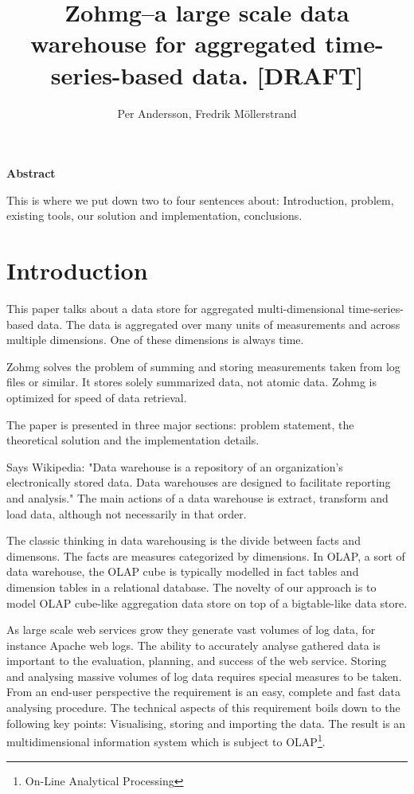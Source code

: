 \documentclass[a4paper,10pt]{book}
\author{Per Andersson, Fredrik M{\"o}llerstrand}
\title{Zohmg--a large scale data warehouse for aggregated time-series-based
data. [DRAFT]}
\begin{document}
\maketitle



\noindent \Large{\textbf{Abstract}}

\vspace{12pt}

\noindent This is where we put down two to four sentences about:
Introduction, problem, existing tools, our solution and implementation,
conclusions.


\tableofcontents

\vfill

\pagebreak



\chapter{Introduction}

This paper talks about a data store for aggregated multi-dimensional time-series-based data. The data is aggregated over many units of measurements and across multiple dimensions. One of these dimensions is always time.

Zohmg solves the problem of summing and storing measurements taken from log files or similar. It stores solely summarized data, not atomic data. Zohmg is optimized for speed of data retrieval.

The paper is presented in three major sections: problem statement, the theoretical solution and the implementation details.

Says Wikipedia: "Data warehouse is a repository of an organization's electronically stored data. Data warehouses are designed to facilitate reporting and analysis." The main actions of a data warehouse is extract, transform and load data, although not necessarily in that order.

The classic thinking in data warehousing is the divide between facts and dimensons. The facts are measures categorized by dimensions. In OLAP, a sort of data warehouse, the OLAP cube is typically modelled in fact tables and dimension tables in a relational database. The novelty of our approach is to model OLAP cube-like aggregation data store on top of a bigtable-like data store.


As large scale web services grow they generate vast volumes of log data,
for instance Apache web logs. The ability to accurately analyse gathered
data is important to the evaluation, planning, and success of the web
service. Storing and analysing massive volumes of log data requires
special measures to be taken. From an end-user perspective the requirement
is an easy, complete and fast data analysing procedure. The technical
aspects of this requirement boils down to the following key points:
Visualising, storing and importing the data. The result is an
multidimensional information system which is subject to
OLAP\footnote{On-Line Analytical Processing}. \cite{olap_solutions}
\end{document}
